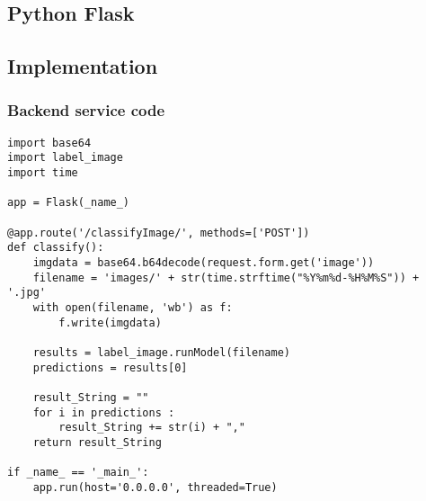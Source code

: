 \subsection*{Python Flask}

\subsection*{Implementation}
\subsubsection*{Backend service code}
\begin{lstlisting}[style=Python]
import base64
import label_image
import time

app = Flask(_name_)

@app.route('/classifyImage/', methods=['POST'])
def classify():
    imgdata = base64.b64decode(request.form.get('image'))
    filename = 'images/' + str(time.strftime("%Y%m%d-%H%M%S")) + '.jpg'
    with open(filename, 'wb') as f:
        f.write(imgdata)

    results = label_image.runModel(filename)
    predictions = results[0]

    result_String = ""
    for i in predictions :
        result_String += str(i) + ","
    return result_String

if _name_ == '_main_':
    app.run(host='0.0.0.0', threaded=True)
\end{lstlisting}

